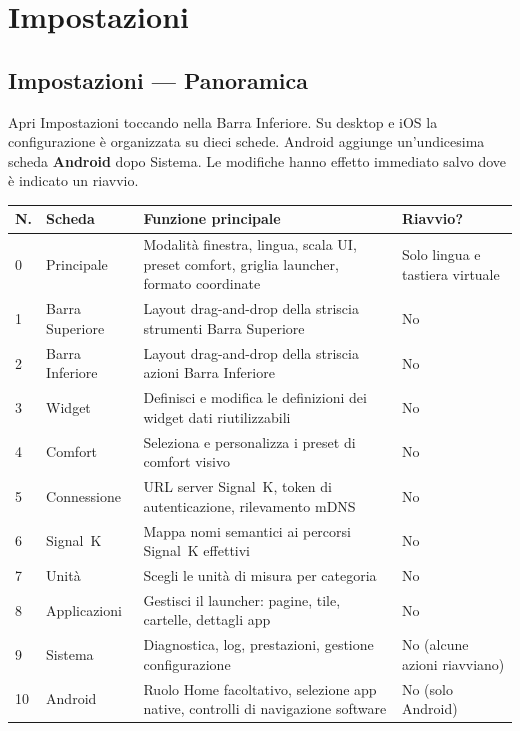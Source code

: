 \part{Impostazioni}

\chapter{Impostazioni --- Panoramica}
\label{ch:impostazioni}

Apri Impostazioni toccando  nella Barra Inferiore.
Su desktop e iOS la configurazione è organizzata su dieci schede. Android aggiunge
un'undicesima scheda \textbf{Android} dopo Sistema.
Le modifiche hanno effetto immediato salvo dove è indicato un riavvio.


\begin{longtable}{C{0.6cm}L{3.2cm}L{6.4cm}L{3.5cm}}
\toprule
{}
\color{white}\sffamily\bfseries N. &
\color{white}\sffamily\bfseries Scheda &
\color{white}\sffamily\bfseries Funzione principale &
\color{white}\sffamily\bfseries Riavvio? \\
 & Principale      & Modalità finestra, lingua, scala UI, preset comfort, griglia launcher, formato coordinate & Solo lingua e tastiera virtuale \\
1 & Barra Superiore & Layout drag-and-drop della striscia strumenti Barra Superiore & No \\
2 & Barra Inferiore & Layout drag-and-drop della striscia azioni Barra Inferiore & No \\
3 & Widget          & Definisci e modifica le definizioni dei widget dati riutilizzabili & No \\
4 & Comfort         & Seleziona e personalizza i preset di comfort visivo & No \\
5 & Connessione     & URL server Signal~K, token di autenticazione, rilevamento mDNS & No \\
6 & Signal~K        & Mappa nomi semantici ai percorsi Signal~K effettivi & No \\
7 & Unità           & Scegli le unità di misura per categoria & No \\
8 & Applicazioni    & Gestisci il launcher: pagine, tile, cartelle, dettagli app & No \\
9 & Sistema         & Diagnostica, log, prestazioni, gestione configurazione & No (alcune azioni riavviano) \\
10 & Android        & Ruolo Home facoltativo, selezione app native, controlli di navigazione software & No (solo Android) \\
\bottomrule
\end{longtable}

